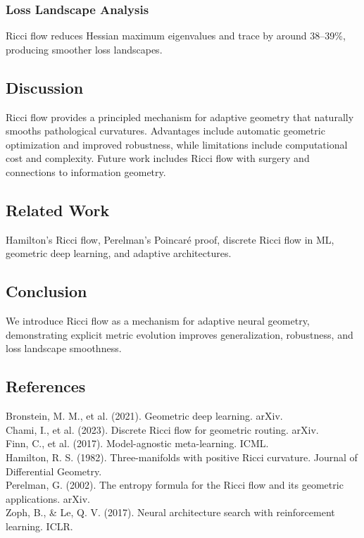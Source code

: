 \documentclass{article}
\numberwithin{equation}{section}
\begin{document}
\subsubsection{Loss Landscape Analysis}
Ricci flow reduces Hessian maximum eigenvalues and trace by around 38--39\%, producing smoother loss landscapes.

\subsection{Discussion}
Ricci flow provides a principled mechanism for adaptive geometry that naturally smooths pathological curvatures. Advantages include automatic geometric optimization and improved robustness, while limitations include computational cost and complexity. Future work includes Ricci flow with surgery and connections to information geometry.

\subsection{Related Work}
Hamilton’s Ricci flow, Perelman’s Poincaré proof, discrete Ricci flow in ML, geometric deep learning, and adaptive architectures.

\subsection{Conclusion}
We introduce Ricci flow as a mechanism for adaptive neural geometry, demonstrating explicit metric evolution improves generalization, robustness, and loss landscape smoothness.

\subsection*{References}
Bronstein, M. M., et al. (2021). Geometric deep learning. arXiv.\\
Chami, I., et al. (2023). Discrete Ricci flow for geometric routing. arXiv.\\
Finn, C., et al. (2017). Model-agnostic meta-learning. ICML.\\
Hamilton, R. S. (1982). Three-manifolds with positive Ricci curvature. Journal of Differential Geometry.\\
Perelman, G. (2002). The entropy formula for the Ricci flow and its geometric applications. arXiv.\\
Zoph, B., \& Le, Q. V. (2017). Neural architecture search with reinforcement learning. ICLR.
\end{document}
